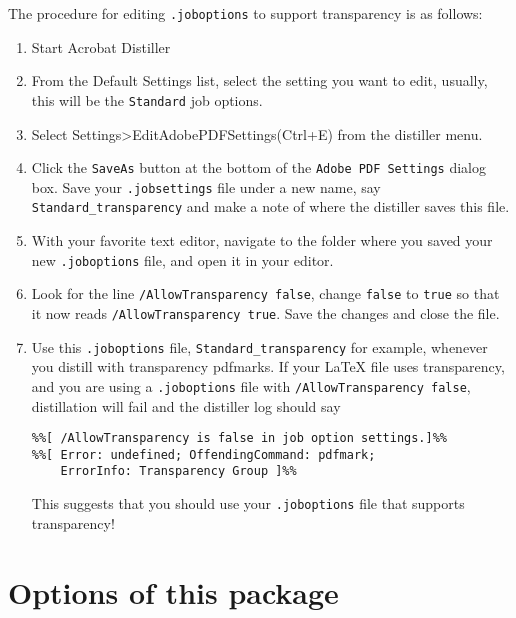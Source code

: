 \documentclass{article}
\begin{document}
\newtopic\noindent
The procedure for editing \texttt{.joboptions} to support transparency is as follows:
\begin{enumerate}
    \item Start Acrobat Distiller

    \item From the Default Settings list, select the setting you want to
        edit, usually, this will be the \texttt{Standard} job options.
    \item Select \textsf{Settings\;>\;Edit\;Adobe\;PDF\;Settings\;(Ctrl+E)}
        from the distiller menu.
    \item Click the \texttt{SaveAs} button at the bottom of the
        \texttt{Adobe PDF Settings} dialog box. Save your
        \texttt{.jobsettings} file under a new name, say
        \texttt{Standard\_transparency} and make a note of where the
        distiller saves this file.
    \item With your favorite text editor, navigate to the folder where you
        saved your new \texttt{.joboptions} file, and open it in your
        editor.
    \item Look for the line \texttt{/AllowTransparency false}, change
        \texttt{false} to \texttt{true} so that it now reads
        \texttt{/AllowTransparency true}. Save the changes and close the
        file.
    \item Use this \texttt{.joboptions} file,
        \texttt{Standard\_transparency} for example, whenever you distill
        with transparency pdfmarks.  If your {\LaTeX} file uses
        transparency, and you are using a \texttt{.joboptions} file with
        \texttt{/AllowTransparency false}, distillation will fail and the
        distiller log should say
\begin{Verbatim}[fontsize=\small]
%%[Error: The PostScript contains Transparency pdfmark, job aborted.]%%
%%[ /AllowTransparency is false in job option settings.]%%
%%[ Error: undefined; OffendingCommand: pdfmark;
    ErrorInfo: Transparency Group ]%%
\end{Verbatim}
This suggests that you should use your \texttt{.joboptions} file that supports transparency!

\end{enumerate}

\section{Options of this package}
\end{document}
